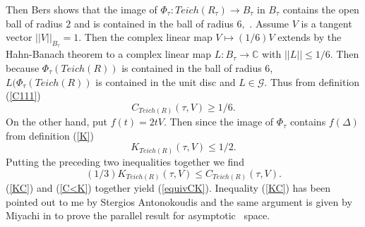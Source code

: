 \documentclass[12pt]{amsart}
\theoremstyle{remark}
\theoremstyle{definition}
\theoremstyle{definition}
\begin{document}
\begin{section}
 
 Then Bers shows that the image of 
 $\Phi_{\tau}: Teich(R_{\tau}) \rightarrow B_{\tau}$
  in $B_{\tau}$ contains the open ball of radius $2$  and is contained in the ball of radius $6,$ 
  \cite{Ahlforsbook5}.  
    Assume $V$ is a tangent vector $||V||_{B_{\tau}}=1.$  Then the complex linear map $V \mapsto (1/6)V$ extends by the Hahn-Banach theorem to a complex linear map $L: B_{\tau} \rightarrow {\mathbb C}$  
    with 
  $||L||\leq 1/6.$  Then because $\Phi_{\tau}(Teich(R))$ 
  is contained in the ball of radius $6$,
   $L(\Phi_{\tau}(Teich(R))$  is contained in the unit disc and $L  \in {\mathcal G}.$ Thus from definition (\ref{C111})  
  $$C_{Teich(R)}(\tau,V) \geq 1/6.$$
  On the other hand, put $f(t)=2tV.$ Then since the image of $\Phi_{\tau}$ contains 
  $f(\Delta)$ from definition (\ref{K}) 
  $$K_{Teich(R)}(\tau,V) \leq 1/2.$$ Putting the preceding two inequalities together we find
 \begin{equation}\label{KC}
 (1/3) K_{Teich(R)}(\tau,V) \leq C_{Teich(R)}(\tau,V).
 \end{equation} 
 (\ref{KC}) and (\ref{C<K}) together yield (\ref{equivCK}).
 Inequality (\ref{KC}) has been pointed out to me by Stergios Antonokoudis and the same argument is given  by Miyachi  in \cite{Miyachi4} to prove the parallel result for asymptotic \te\ space. 
 \end{section}
 

 
  
\end{document}
